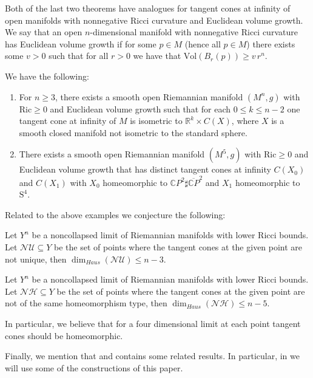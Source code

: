 \documentclass[11pt]{article}
\newcommand{\Ric}{\text{Ric}}
\newcommand{\Vol}{\text{Vol}}
\newcommand{\RR}{\mathds{R}}
\begin{document}
Both of the last two theorems have analogues for tangent cones at infinity of open manifolds with nonnegative Ricci curvature and Euclidean volume growth.  We say that an open $n$-dimensional manifold with nonnegative Ricci curvature has Euclidean volume growth if for some $p\in M$ (hence all $p\in M$) there exists some $v>0$ such that for all $r>0$ we have that $\Vol (B_r(p))\geq v\,r^n$.  

\begin{theorem}
 We have the following:
\begin{enumerate}
 \item For $n\geq 3$, there exists a smooth open Riemannian manifold $(M^n,g)$ with $\Ric\geq 0$ and Euclidean volume growth such that for each $0\leq k\leq n-2$ one tangent cone at infinity of $M$ is isometric to $\RR^k\times C(X)$, where $X$ is a smooth closed manifold not isometric to the standard sphere.
\item There exists a smooth open Riemannian manifold $(M^5,g)$ with $\Ric\geq 0$ and Euclidean volume growth that has distinct tangent cones at infinity $C(X_0)$ and $C(X_1)$ with $X_0$ homeomorphic to $\mathds{C}P^2\sharp \overline{\mathds{C}P}^2$ and $X_1$ homeomorphic to $\text{S}^4$.
\end{enumerate}
\end{theorem}


Related to the above examples we conjecture the following:

\begin{conjecture}
Let $Y^n$ be a noncollapsed limit of Riemannian manifolds with lower Ricci bounds.  Let $\mathcal{NU}\subseteq Y$ be the set of points where the tangent cones at the given point are not unique, then $\dim_{Haus}(\mathcal{NU})\leq n-3$.
\end{conjecture}

\begin{conjecture}
Let $Y^n$ be a noncollapsed limit of Riemannian manifolds with lower Ricci bounds.  Let $\mathcal{NH}\subseteq Y$ be the set of points where the tangent cones at the given point are not of the same homeomorphism type, then $\dim_{Haus}(\mathcal{NH})\leq n-5$.
\end{conjecture}

In particular, we believe that for a four dimensional limit at each point tangent cones should be homeomorphic.

\vskip2mm
Finally, we mention that \cite{CN1} and \cite{CN2} contains some related results. In particular, in \cite{CN2} we will use some of the constructions of this paper. 
\end{document}
